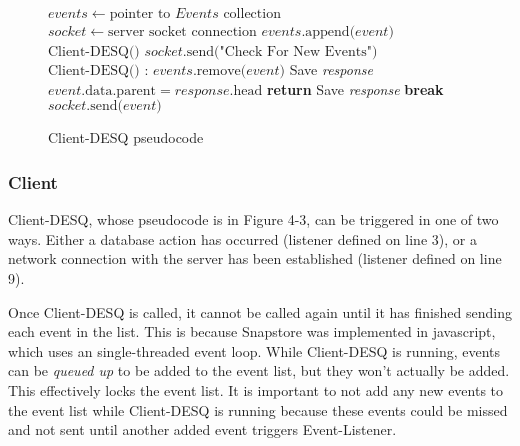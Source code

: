 \begin{center}
\begin{figure}[ht]
\begin{algorithmic}[1]
\State $events \gets \text{pointer to }Events \text{ collection}$
\State $socket \gets \text{server socket connection}$
\State $events\text{.append(}event\text{)}$
\EndWhile
\EndFunction
{}
\State $\text{Client-DESQ()}$
\EndWhile
\EndFunction
{}
\State $socket\text{.send("Check For New Events")}$
\State $\text{Client-DESQ()}$
\EndWhile
\EndFunction
{}
:
\State $events\text{.remove(}event\text{)}$
 
\State Save \emph{response} 
\State $event\text{.data.parent} = response\text{.head}$
\EndIf
\Else {}
\State \textbf{return}
\EndIf
\State Save \emph{response}
\EndIf
\EndWhile
\EndFunction
{}
\State \textbf{break}
\EndIf
\State $socket\text{.send(}event\text{)}$
\EndFor
\EndProcedure
\end{algorithmic}
\caption{Client-DESQ pseudocode}\label{euclid}
\end{figure}
\end{center}

\subsubsection{Client}

Client-DESQ, whose pseudocode is in Figure 4-3, can be triggered in one of two ways. Either a database action has occurred (listener defined on line 3), or a network connection with the server has been established (listener defined on line 9). 

Once Client-DESQ is called, it cannot be called again until it has finished sending each event in the list. This is because Snapstore was implemented in javascript, which uses an single-threaded event loop. While Client-DESQ is running, events can be \textit{queued up} to be added to the event list, but they won't actually be added. This effectively locks the event list. It is important to not add any new events to the event list while Client-DESQ is running because these events could be missed and not sent until another added event triggers Event-Listener.

